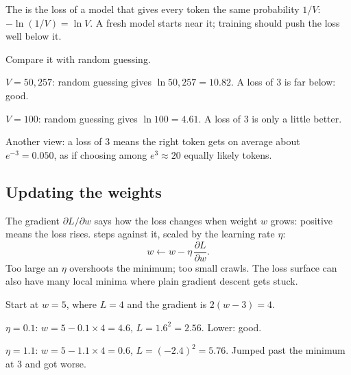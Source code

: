\begin{definition}
The  is the loss of a model that gives every token the same probability $1/V$: $-\ln(1/V) = \ln V$. A fresh model starts near it; training should push the loss well below it.
\end{definition}

\begin{example}
Compare it with random guessing.
\begin{steps}
  \item $V = 50{,}257$: random guessing gives $\ln 50{,}257 = 10.82$. A loss of 3 is far below: good.
  \item $V = 100$: random guessing gives $\ln 100 = 4.61$. A loss of 3 is only a little better.
  \item Another view: a loss of 3 means the right token gets on average about $e^{-3} = 0.050$, as if choosing among $e^3 \approx 20$ equally likely tokens.
\end{steps}
\end{example}

\subsection*{Updating the weights}

\begin{definition}
The gradient $\partial L/\partial w$ says how the loss changes when weight $w$ grows: positive means the loss rises.  steps against it, scaled by the learning rate $\eta$:
\[
w \leftarrow w - \eta\, \frac{\partial L}{\partial w}.
\]
Too large an $\eta$ overshoots the minimum; too small crawls. The loss surface can also have many local minima where plain gradient descent gets stuck.
\end{definition}

\begin{example}[One weight, $L(w) = (w - 3)^2$]
Start at $w = 5$, where $L = 4$ and the gradient is $2(w - 3) = 4$.
\begin{steps}
  \item $\eta = 0.1$: $w = 5 - 0.1 \times 4 = 4.6$, $L = 1.6^2 = 2.56$. Lower: good.
  \item $\eta = 1.1$: $w = 5 - 1.1 \times 4 = 0.6$, $L = (-2.4)^2 = 5.76$. Jumped past the minimum at 3 and got worse.
\end{steps}
\end{example}

